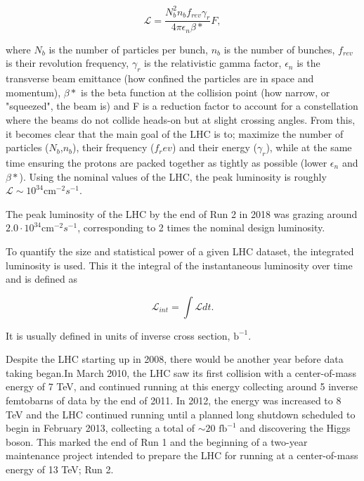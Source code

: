 \begin{equation}
  \mathcal L = \frac {N_b^2 n_b f_{rev} \gamma_r} {4 \pi \epsilon_n \beta *}F,
\end{equation}

where $N_b$ is the number of particles per bunch, $n_b$ is the number of bunches, $f_{rev}$ is their revolution frequency, $\gamma_r$ is the relativistic gamma factor,
$\epsilon_n$ is the transverse beam emittance (how confined the particles are in space and momentum), $\beta *$ is the beta function at the collision point (how narrow, or "squeezed", the beam is) and F is a reduction factor to account for a constellation where the beams do not collide heads-on but at slight crossing angles.
From this, it becomes clear that the main goal of the LHC is to; maximize the number of particles ($N_b$,$n_b$), their frequency ($f_rev$) and their energy ($\gamma_r$),
while at the same time ensuring the protons are packed together as tightly as possible (lower $\epsilon_n$ and $\beta *$).
Using the nominal values of the LHC, the peak luminosity is roughly $\mathcal L \sim 10^{34} \textrm{cm}^{-2} s^{-1}$. 


The peak luminosity of the LHC by the end of Run 2 in 2018 was grazing around $2.0 \cdot 10^{34} \textrm{cm}^{-2} s^{-1}$, corresponding to 2 times the nominal design luminosity.

To quantify the size and statistical power of a given LHC dataset, the integrated luminosity is used. This it the integral of the instantaneous luminosity over time and is defined as

\begin{equation}
  \mathcal L_{int} = \int \mathcal L dt.
\end{equation}

It is usually defined in units of inverse cross section, $\textrm{b}^{-1}$.


Despite the LHC starting up in 2008, there would be another year before data taking began.In March 2010, the LHC saw its first collision with a center-of-mass energy of 7 TeV, and continued running at this energy collecting around 5 inverse femtobarns of data by the end of 2011. In 2012, the energy was increased to 8 TeV and the LHC continued running until a planned long shutdown scheduled to begin in February 2013, collecting a total of $\sim 20 \textrm{ fb}^{-1}$ and discovering the Higgs boson. 
This marked the end of Run 1 and the beginning of a two-year maintenance project intended to prepare the LHC for running at a center-of-mass energy of 13 TeV; Run 2.

